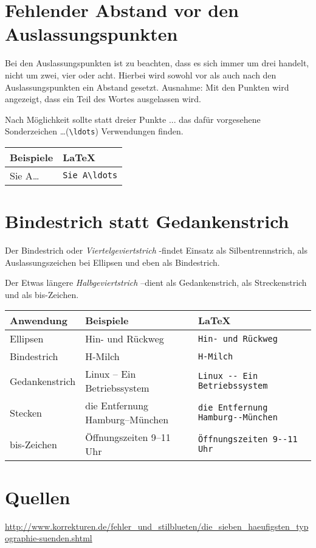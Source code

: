 \documentclass[a4paper]{article}
\begin{document}
\section{Fehlender Abstand vor den Auslassungspunkten}
Bei den Auslassungspunkten ist zu beachten, dass es sich immer um drei handelt,
nicht um zwei, vier oder acht. Hierbei wird sowohl vor als auch nach den
Auslassungspunkten ein Abstand gesetzt. Ausnahme: Mit den Punkten wird
angezeigt, dass ein Teil des Wortes ausgelassen wird.

Nach Möglichkeit sollte statt dreier Punkte ... das dafür vorgesehene
Sonderzeichen \ldots (\verb+\ldots+) Verwendungen finden.

\begin{tabular}[c]{|ll|}
	\hline
	\bf{Beispiele} & \bf{\LaTeX}        \\
	\hline
	Sie A\ldots    & \verb+Sie A\ldots+ \\
	\hline
\end{tabular}

\section{Bindestrich statt Gedankenstrich}
Der Bindestrich oder \emph{Viertelgeviertstrich} \glqq-\grqq findet Einsatz als
Silbentrennstrich, als Auslassungszeichen bei Ellipsen und eben als
Bindestrich.

Der Etwas längere \emph{Halbgeviertstrich} \glqq--\grqq dient als Gedankenstrich, als
Streckenstrich und als bis-Zeichen.

\begin{tabular}[c]{|lll|}
	\hline
	\bf{Anwendung} & \bf{Beispiele}                  & \bf{\LaTeX}                            \\
	\hline
	Ellipsen       & Hin- und Rückweg                & \verb+Hin- und Rückweg+                \\
	Bindestrich    & H-Milch                         & \verb+H-Milch+                         \\
	Gedankenstrich & Linux -- Ein Betriebssystem     & \verb+Linux -- Ein Betriebssystem +    \\
	Stecken        & die Entfernung Hamburg--München & \verb+die Entfernung Hamburg--München+ \\
	bis-Zeichen    & Öffnungszeiten 9--11 Uhr        & \verb+Öffnungszeiten 9--11 Uhr+        \\
	\hline
\end{tabular}

\section{Quellen}
\url{http://www.korrekturen.de/fehler_und_stilblueten/die_sieben_haeufigsten_typographie-suenden.shtml}
\end{document}
